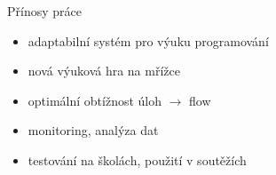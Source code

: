 \documentclass[
]{beamer}
\begin{document}
\begin{frame}{Přínosy práce}
\begin{itemize}
\item adaptabilní systém pro výuku programování
\item nová výuková hra na mřížce
\item optimální obtížnost úloh $\rightarrow$ flow
\item monitoring, analýza dat
\item testování na školách, použití v soutěžích
\end{itemize}
\end{frame}

\end{document}
